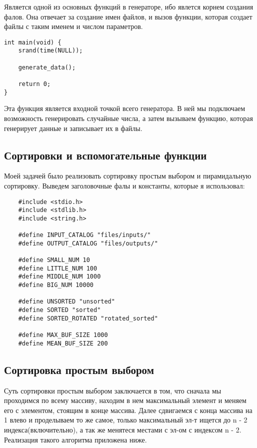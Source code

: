 \documentclass[a4paper,12pt,titlepage,finall]{article}
\begin{document}
Является одной из основных функций в генераторе, ибо явлется корнем создания фалов.
Она отвечает за создание имен файлов, и вызов функции, которая создает файлы с таким именем и числом параметров.

\begin{verbatim}
int main(void) {
    srand(time(NULL));

    generate_data();

    return 0;
}
\end{verbatim}

Эта функция является входной точкой всего генератора.
В ней мы подключаем возможность генерировать случайные числа,
а затем вызываем функцию, которая генерирует данные и записывает их в файлы.

\newpage

\subsection{Сортировки и вспомогательные функции}

Моей задачей было реализовать сортировку простым выбором и пирамидальную сортировку.
Выведем заголовочные фалы и константы, которые я использовал:
\begin{verbatim}
    #include <stdio.h>
    #include <stdlib.h>
    #include <string.h>
    
    #define INPUT_CATALOG "files/inputs/"
    #define OUTPUT_CATALOG "files/outputs/"
    
    #define SMALL_NUM 10
    #define LITTLE_NUM 100
    #define MIDDLE_NUM 1000
    #define BIG_NUM 10000
    
    #define UNSORTED "unsorted"
    #define SORTED "sorted"
    #define SORTED_ROTATED "rotated_sorted"
    
    #define MAX_BUF_SIZE 1000
    #define MEAN_BUF_SIZE 200
\end{verbatim}

\subsection{Сортировка простым выбором}

Суть сортировки простым выбором заключается в том, что сначала мы проходимся по всему массиву, находим
в нем максимальный элемент и меняем его с элементом, стоящим в конце массива. Далее сдвигаемся с конца массива на 1 влево
и проделываем то же самое, только максимальный эл-т ищется до n - 2 индекса(включительно),
а так же менятеся местами с эл-ом с индексом n - 2. Реализация такого алгоритма приложена ниже.
\end{document}
